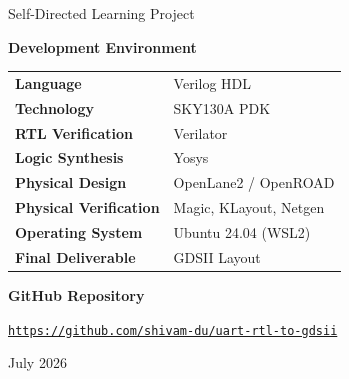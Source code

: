 \begin{titlepage}
\begin{center}
\vspace{0.20cm}

{\large
Self-Directed Learning Project
}

\vspace{0.70cm}


{\Large\bfseries\color{SectionBlue}
Development Environment
}

\vspace{0.35cm}

\renewcommand{\arraystretch}{1.25}

\begin{tabular}{>{\bfseries}p{4.5cm}p{8cm}}

Language &
Verilog HDL \\

Technology &
SKY130A PDK \\

RTL Verification &
Verilator \\

Logic Synthesis &
Yosys \\

Physical Design &
OpenLane2 / OpenROAD \\

Physical Verification &
Magic, KLayout, Netgen \\

Operating System &
Ubuntu 24.04 (WSL2) \\

Final Deliverable &
GDSII Layout \\

\end{tabular}

\vspace{0.70cm}


{\Large\bfseries\color{SectionBlue}
GitHub Repository
}

\vspace{0.15cm}

\href{https://github.com/shivam-du/uart-rtl-to-gdsii}
{\texttt{https://github.com/shivam-du/uart-rtl-to-gdsii}}

\vfill

{\Large
July 2026
}

\end{center}

\end{titlepage}